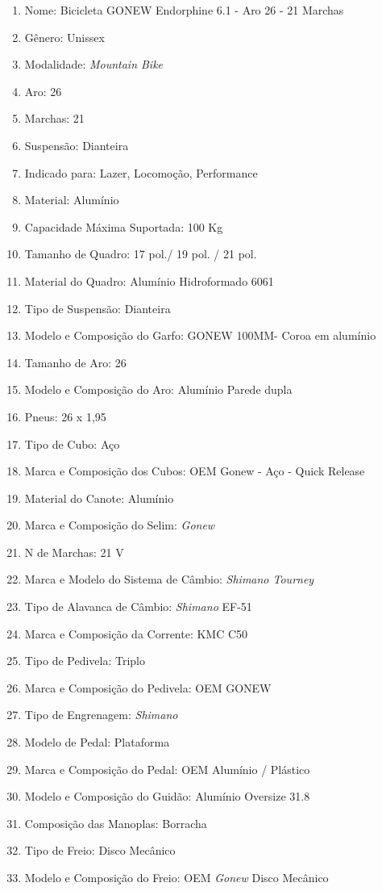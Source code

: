 \begin{itemize}
\begin{itemize}
		\begin{enumerate}
		\item Nome:  Bicicleta GONEW Endorphine 6.1 - Aro 26 - 21 Marchas
		\item Gênero:  Unissex
		\item Modalidade: \textit{Mountain Bike}
		\item Aro: 26
 		\item Marchas: 21
		\item Suspensão: Dianteira
		\item Indicado para: Lazer, Locomoção, Performance
		\item Material: Alumínio
		\item Capacidade Máxima Suportada: 100 Kg
		\item Tamanho de Quadro: 17 pol./ 19 pol. / 21 pol.
		\item Material do Quadro: Alumínio Hidroformado 6061
		\item Tipo de Suspensão: Dianteira
		\item Modelo e Composição do Garfo: GONEW 100MM- Coroa em alumínio
		\item Tamanho de Aro: 26
		\item Modelo e Composição do Aro: Alumínio Parede dupla
		\item Pneus: 26 x 1,95
		\item Tipo de Cubo: Aço
		\item Marca e Composição dos Cubos: OEM Gonew - Aço - Quick Release
		\item Material do Canote: Alumínio
		\item Marca e Composição do Selim: \textit{Gonew}
		\item N de Marchas: 21 V
		\item Marca e Modelo do Sistema de Câmbio: \textit{Shimano Tourney}
		\item Tipo de Alavanca de Câmbio: \textit{Shimano} EF-51
		\item Marca e Composição da Corrente: KMC C50
		\item Tipo de Pedivela: Triplo
		\item Marca e Composição do Pedivela: OEM GONEW
		\item Tipo de Engrenagem: \textit{Shimano}
		\item Modelo de Pedal: Plataforma
		\item Marca e Composição do Pedal: OEM Alumínio / Plástico
		\item Modelo e Composição do Guidão: Alumínio Oversize 31.8
		\item Composição das Manoplas: Borracha
		\item Tipo de Freio: Disco Mecânico
 		\item Modelo e Composição do Freio: OEM \textit{Gonew} Disco Mecânico
		\end{enumerate}
	\end{itemize}
\end{itemize}